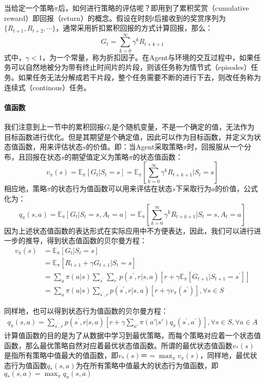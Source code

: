 当给定一个策略$\pi$后，如何进行策略的评估呢？即用到了累积奖赏（cumulative reward）即回报（return）的概念。假设在时刻$t$后接收到的奖赏序列为$\{R_{t+1}, R_{t+2},\cdots\}$，通常采用折扣累积回报的方式计算回报，那么：
\begin{equation}
G_{t}=\sum_{k=0}^{\infty}\gamma^{k}R_{t+k+1}
\end{equation}
式中，$\gamma<1$，为一个常量，称为折扣因子。在Agent与环境的交互过程中，如果任务可以自然地被分为带有终止时间片的片段，则该任务称为情节式（episodes）任务。如果任务无法分解成若干片段，整个任务需要不断的进行下去，则改任务称为连续式（continous）任务。

\paragraph{值函数}
我们注意到上一节中的累积回报$G_{t}$是个随机变量，不是一个确定的值，无法作为目标函数进行优化。但是其期望是个确定值，因此可以作为目标函数，并定义为状态值函数，用来评估状态$s$的价值。即：当Agent采取策略$\pi$时，回报服从一个分布，且回报在状态$s$的期望值定义为策略$\pi$的状态值函数：
\begin{equation}
v_{\pi}(s)=\mathbb{E}_{\pi}[G_{t}|S_t=s]=\mathbb{E}_{\pi}[\sum_{k=0}^{\infty}\gamma^{k}R_{t+k+1}|S_t=s]
\end{equation}
相应地，策略$\pi$的状态行为值函数可以用来评估在状态$s$下采取行为$a$的价值，公式化为：
\begin{equation}
q_{\pi}(s,a)=\mathbb{E}_{\pi}[G_{t}|S_t=s,A_t=a]
=\mathbb{E}_{\pi}[\sum_{k=0}^{\infty}\gamma^{k}R_{t+k+1}|S_t=s,A_t=a]
\end{equation}
因为上述状态值函数的表达形式在实际应用中不方便表达，因此，我们可以进行进一步的推导，得到状态值函数的贝尔曼方程：
\begin{equation}
\label{seq1}
\begin{aligned}
v_{\pi}(s)&=\mathbb{E}_{\pi}[G_{t}|S_t=s]\\
&=\mathbb{E}_{\pi}[R_{t+1}+\gamma G_{t+1}|S_t=s]\\
&=\sum_{a}\pi(a|s)\sum_{s^{'}}\sum_{r^{'}}p(s^{'},r|s,a)[r + \gamma\mathbb{E}_{\pi}[G_{t+1}|S_{t+1}=s^{'}]]\\
&=\sum_{a}\pi(a|s)\sum_{s^{'},r}p(s^{'},r|s,a)[r+\gamma v_{\pi}(s^{'})], \forall s \in S
\end{aligned}
\end{equation}

同样地，也可以得到状态行为值函数的贝尔曼方程：
\begin{equation}
\label{seq2}
\begin{aligned}
q_{\pi}(s,a)=\sum_{s^{'},r}p(s^{'},r|s,a)[r+\gamma \sum_{a'}\pi(a'|s') q_{\pi}(s^{'},a^{'})], \forall s \in S, \forall a \in A
\end{aligned}
\end{equation}
计算值函数的目的是为了从数据中学习到最优策略，而每个策略对应着一个状态值函数，那么最优策略自然对应着最优状态值函数。所谓的最优状态值函数$v_{*}(s)$是指所有策略中值最大的值函数，即$v_{*}(s)＝=\max_{\pi}v_{\pi}(s)$，同样地，最优状态行为值函数$q_{*}(s,a)$为在所有策略中值最大的状态行为值函数，即$q_{*}(s,a)=\max_{\pi}q_{\pi}(s,a)$

